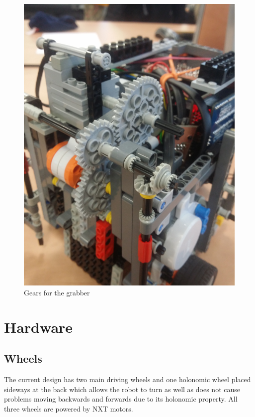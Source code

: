 \documentclass[12pt]{article}
\begin{document}
\begin{figure}
\begin{minipage}[b]{.48\textwidth}
		\includegraphics[scale=.065,angle=-90]{gears.jpg}
		\caption{Gears for the grabber}
		\label{fig:gears}
	\end{minipage}
	
\end{figure}


\section{Hardware}

\subsection{Wheels}
The current design has two main driving wheels and one holonomic wheel placed sideways at the back which allows the robot to turn as well as does not cause problems moving backwards and
forwards due to its holonomic property. All three wheels are powered by NXT motors.
\end{document}

